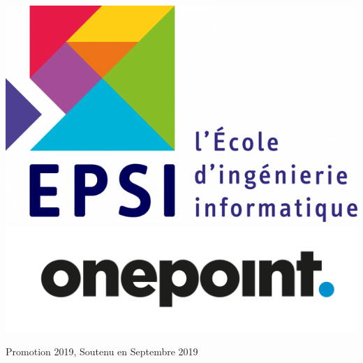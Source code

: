 \begin{titlepage}
\includegraphics[scale=0.2]{img/epsi.png}\\[1cm] %

\includegraphics[scale=0.05]{img/onepoint.png}\\[1cm] %

\begin{flushright} \large 
	Promotion 2019, Soutenu en Septembre 2019
\end{flushright}

\vfill %

\end{titlepage}